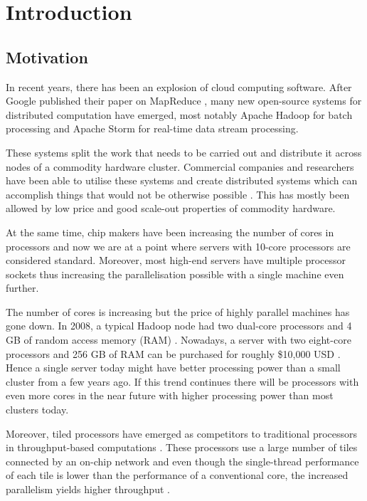 \documentclass[bsc,twoside,singlespacing,normalheadings,parskip]{infthesis}\usepackage[]{graphicx}\usepackage[]{color}
\begin{document}
\cleardoublepage
{}

\clearpage{}\chapter{Introduction}

\section{Motivation}

In recent years, there has been an explosion of cloud computing software. After Google published their paper on MapReduce \citep{dean2010mapreduce}, many new open-source systems for distributed computation have emerged, most notably Apache Hadoop \citep{ApacheHadoop} for batch processing and Apache Storm \citep{ApacheStorm} for real-time data stream processing.

These systems split the work that needs to be carried out and distribute it across nodes of a commodity hardware cluster. Commercial companies and researchers have been able to utilise these systems and create distributed systems which can accomplish things that would not be otherwise possible \cite{Solovey, Bifet:2010:MMO:1756006.1859903}. This has mostly been allowed by low price and good scale-out properties of commodity hardware.

At the same time, chip makers have been increasing the number of cores in processors and now we are at a point where servers with 10-core processors are considered standard. Moreover, most high-end servers have multiple processor sockets thus increasing the parallelisation possible with a single machine even further.

The number of cores is increasing but the price of highly parallel machines has gone down. In 2008, a typical Hadoop node had two dual-core processors and 4 GB of random access memory (RAM) \citep{Kumar:2013:HSD:2536274.2536314}. Nowadays, a server with two eight-core processors and 256 GB of RAM can be purchased for roughly \$10,000 USD \citep{Kumar:2013:HSD:2536274.2536314}. Hence a single server today might have better processing power than a small cluster from a few years ago. If this trend continues there will be processors with even more cores in the near future with higher processing power than most clusters today.

Moreover, tiled processors have emerged as competitors to traditional processors in throughput-based computations \cite{Tilera}. These processors use a large number of tiles connected by an on-chip network and even though the single-thread performance of each tile is lower than the performance of a conventional core, the increased parallelism yields higher throughput \cite{DBLP:conf/isca/Lotfi-KamranGFVKPAJIOF12}.
\end{document}
